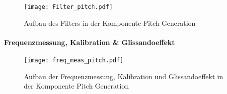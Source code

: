 \begin{figure}[h!]
	\centering
	\texttt{[image: Filter\_pitch.pdf]}
	\caption{Aufbau des Filters in der Komponente Pitch Generation} 
	\label{img:Filter_Pitch}
\end{figure}  

\paragraph{Frequenzmessung, Kalibration \& Glissandoeffekt}

\begin{figure}[h!]
	\centering
	\texttt{[image: freq\_meas\_pitch.pdf]}
	\caption{Aufbau der Frequenzmessung, Kalibration und Glissandoeffekt in der Komponente Pitch Generation} 
	\label{img:freq_meas_pitch}
\end{figure}  